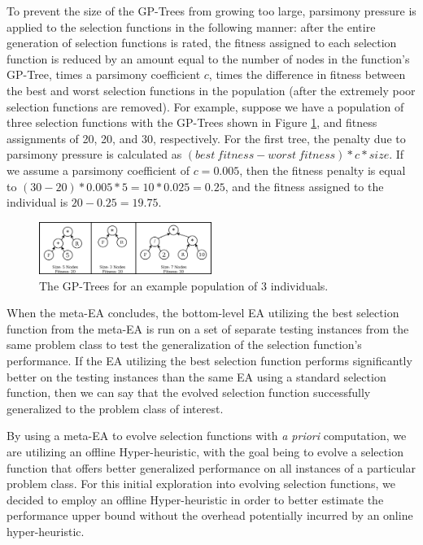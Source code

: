 \documentclass[sigconf]{acmart}
\begin{document}
To prevent the size of the GP-Trees from growing too large, parsimony pressure is applied to the selection functions in the following manner: after the entire generation of selection functions is rated, the fitness assigned to each selection function is reduced by an amount equal to the number of nodes in the function's GP-Tree, times a parsimony coefficient $c$, times the difference in fitness between the best and worst selection functions in the population (after the extremely poor selection functions are removed). For example, suppose we have a population of three selection functions with the GP-Trees shown in Figure \ref{fig:parsimony_example}, and fitness assignments of 20, 20, and 30, respectively. For the first tree, the penalty due to parsimony pressure is calculated as $(best\ fitness - worst\ fitness) * c * size$. If we assume a parsimony coefficient of $c = 0.005$, then the fitness penalty is equal to $(30 - 20) * 0.005 * 5 = 10 * 0.025 = 0.25$, and the fitness assigned to the individual is $20 - 0.25 = 19.75$.

\begin{figure}
	\centering
	\includegraphics[width=0.5\textwidth]{parsimony_example}
	\caption{The GP-Trees for an example population of 3 individuals.}
	\label{fig:parsimony_example}
\end{figure}

When the meta-EA concludes, the bottom-level EA utilizing the best selection function from the meta-EA is run on a set of separate testing instances from the same problem class to test the generalization of the selection function's performance. If the EA utilizing the best selection function performs significantly better on the testing instances than the same EA using a standard selection function, then we can say that the evolved selection function successfully generalized to the problem class of interest. 

By using a meta-EA to evolve selection functions with \textit{a priori} computation, we are utilizing an offline Hyper-heuristic, with the goal being to evolve a selection function that offers better generalized performance on all instances of a particular problem class. For this initial exploration into evolving selection functions, we decided to employ an offline Hyper-heuristic in order to better estimate the performance upper bound without the overhead potentially incurred by an online hyper-heuristic.
\end{document}
